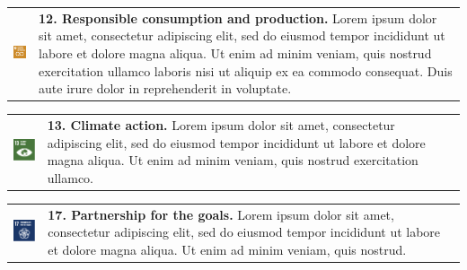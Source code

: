     \noindent
    \begin{tabular}{p{25mm} p{125mm}}
        \vspace{0mm} \includegraphics[width=2cm]{text/appendix/appendix-sdg/resources/sdg12.pdf} & \vspace{-0.5mm} \textbf{12. Responsible consumption and production.} Lorem ipsum dolor sit amet, consectetur adipiscing elit, sed do eiusmod tempor incididunt ut labore et dolore magna aliqua. Ut enim ad minim veniam, quis nostrud exercitation ullamco laboris nisi ut aliquip ex ea commodo consequat. Duis aute irure dolor in reprehenderit in voluptate. \\
    \end{tabular}
    
    \noindent
    \begin{tabular}{p{25mm} p{125mm}}
        \vspace{0mm} \includegraphics[width=2cm]{text/appendix/appendix-sdg/resources/sdg13.pdf} & \vspace{-0.5mm} \textbf{13. Climate action.} Lorem ipsum dolor sit amet, consectetur adipiscing elit, sed do eiusmod tempor incididunt ut labore et dolore magna aliqua. Ut enim ad minim veniam, quis nostrud exercitation ullamco. \\
    \end{tabular}

    \noindent
    \begin{tabular}{p{25mm} p{125mm}}
        \vspace{0mm} \includegraphics[width=2cm]{text/appendix/appendix-sdg/resources/sdg17.pdf} & \vspace{-0.5mm} \textbf{17. Partnership for the goals.} Lorem ipsum dolor sit amet, consectetur adipiscing elit, sed do eiusmod tempor incididunt ut labore et dolore magna aliqua. Ut enim ad minim veniam, quis nostrud. \\
    \end{tabular}

